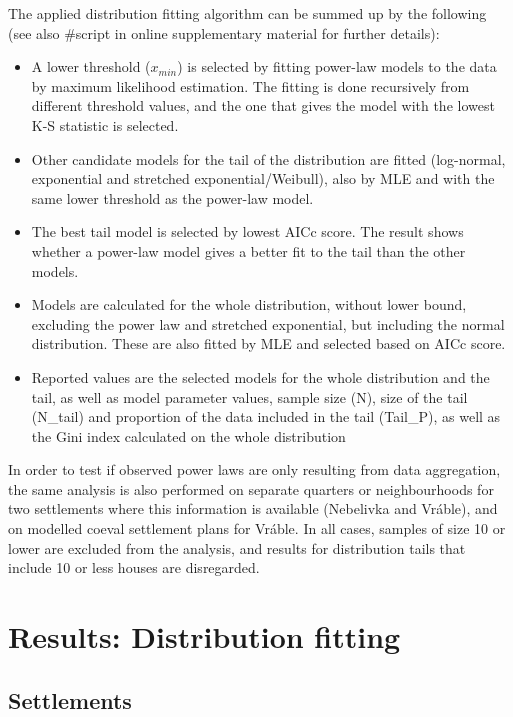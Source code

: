 \documentclass[
  12pt,
  a4paper, twoside]{book}
\begin{document}
The applied distribution fitting algorithm can be summed up by the following (see also \#script in online supplementary material for further details):

\begin{itemize}
\item
  A lower threshold (\(x_{min}\)) is selected by fitting power-law models to the data by maximum likelihood estimation. The fitting is done recursively from different threshold values, and the one that gives the model with the lowest K-S statistic is selected.
\item
  Other candidate models for the tail of the distribution are fitted (log-normal, exponential and stretched exponential/Weibull), also by MLE and with the same lower threshold as the power-law model.
\item
  The best tail model is selected by lowest AICc score. The result shows whether a power-law model gives a better fit to the tail than the other models.
\item
  Models are calculated for the whole distribution, without lower bound, excluding the power law and stretched exponential, but including the normal distribution. These are also fitted by MLE and selected based on AICc score.
\item
  Reported values are the selected models for the whole distribution and the tail, as well as model parameter values, sample size (N), size of the tail (N\_tail) and proportion of the data included in the tail (Tail\_P), as well as the Gini index calculated on the whole distribution
\end{itemize}

In order to test if observed power laws are only resulting from data aggregation, the same analysis is also performed on separate quarters or neighbourhoods for two settlements where this information is available (Nebelivka and Vráble), and on modelled coeval settlement plans for Vráble. In all cases, samples of size 10 or lower are excluded from the analysis, and results for distribution tails that include 10 or less houses are disregarded.

\hypertarget{results-distfit}{%
\chapter{Results: Distribution fitting}\label{results-distfit}}

\hypertarget{settlements}{%
\section{Settlements}\label{settlements}}
\end{document}
